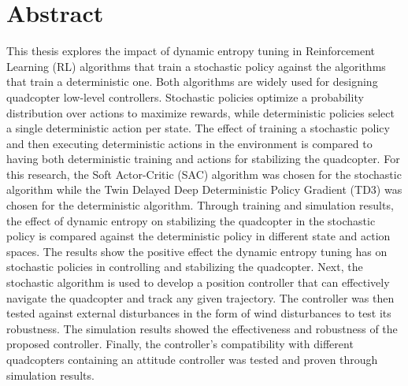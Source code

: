 \chapter*{Abstract}
This thesis explores the impact of dynamic entropy tuning in Reinforcement Learning (RL) algorithms that train a stochastic policy against the algorithms that train a deterministic one. Both algorithms are widely used for designing quadcopter low-level controllers. Stochastic policies optimize a probability distribution over actions to maximize rewards, while deterministic policies select a single deterministic action per state. The effect of training a stochastic policy and then executing deterministic actions in the environment is compared to having both deterministic training and actions for stabilizing the quadcopter. For this research, the Soft Actor-Critic (SAC) algorithm was chosen for the stochastic algorithm while the Twin Delayed Deep Deterministic Policy Gradient (TD3) was chosen for the deterministic algorithm. Through training and simulation results, the effect of dynamic entropy on stabilizing the quadcopter in the stochastic policy is compared against the deterministic policy in different state and action spaces. The results show the positive effect the dynamic entropy tuning has on stochastic policies in controlling and stabilizing the quadcopter. Next, the stochastic algorithm is used to develop a position controller that can effectively navigate the quadcopter and track any given trajectory. The controller was then tested against external disturbances in the form of wind disturbances to test its robustness. The simulation results showed the effectiveness and robustness of the proposed controller. Finally, the controller’s compatibility with different quadcopters containing an attitude controller was tested and proven through simulation results.
\clearpage